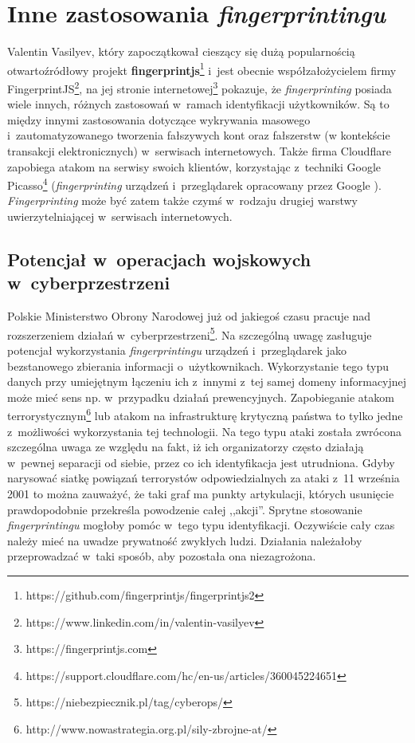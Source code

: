 \section{Inne zastosowania \emph{fingerprintingu}}
Valentin Vasilyev, który zapoczątkował cieszący się dużą popularnością
otwartoźródłowy projekt
\textbf{fingerprintjs}\footnote{https://github.com/fingerprintjs/fingerprintjs2}
i~jest obecnie współzałożycielem firmy
FingerprintJS\footnote{https://www.linkedin.com/in/valentin-vasilyev}, na jej
stronie internetowej\footnote{https://fingerprintjs.com} pokazuje, że
\emph{fingerprinting} posiada wiele innych, różnych zastosowań w~ramach
identyfikacji użytkowników. Są to między innymi zastosowania dotyczące
wykrywania masowego i~zautomatyzowanego tworzenia fałszywych kont oraz
fałszerstw (w kontekście transakcji elektronicznych) w~serwisach internetowych.
Także firma Cloudflare zapobiega atakom na serwisy swoich klientów, korzystając
z~techniki Google
Picasso\footnote{https://support.cloudflare.com/hc/en-us/articles/360045224651}
(\emph{fingerprinting} urządzeń i~przeglądarek opracowany przez Google
\cite{45581}). \emph{Fingerprinting} może być zatem także czymś w~rodzaju
drugiej warstwy uwierzytelniającej w~serwisach internetowych.

\subsection{Potencjał w~operacjach wojskowych w~cyberprzestrzeni}
Polskie Ministerstwo Obrony Narodowej już od jakiegoś czasu pracuje nad
rozszerzeniem działań
w~cyberprzestrzeni\footnote{https://niebezpiecznik.pl/tag/cyberops/}. Na
szczególną uwagę zasługuje potencjał wykorzystania \emph{fingerprintingu}
urządzeń i~przeglądarek jako bezstanowego zbierania informacji o~użytkownikach.
Wykorzystanie tego typu danych przy umiejętnym łączeniu ich z~innymi z~tej samej
domeny informacyjnej może mieć sens np. w~przypadku działań prewencyjnych.
Zapobieganie atakom
terrorystycznym\footnote{http://www.nowastrategia.org.pl/sily-zbrojne-at/} lub
atakom na infrastrukturę krytyczną państwa to tylko jedne z~możliwości
wykorzystania tej technologii. Na tego typu ataki została zwrócona szczególna
uwaga ze względu na fakt, iż ich organizatorzy często działają w~pewnej
separacji od siebie, przez co ich identyfikacja jest utrudniona. Gdyby narysować
siatkę powiązań terrorystów odpowiedzialnych za ataki z~11 września 2001 to
można zauważyć, że taki graf ma punkty artykulacji, których usunięcie
prawdopodobnie przekreśla powodzenie całej ,,akcji''. Sprytne stosowanie
\emph{fingerprintingu} mogłoby pomóc w~tego typu identyfikacji. Oczywiście cały
czas należy mieć na uwadze prywatność zwykłych ludzi. Działania należałoby
przeprowadzać w~taki sposób, aby pozostała ona niezagrożona.

